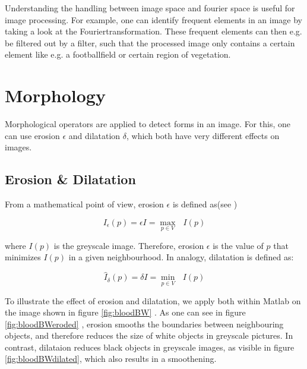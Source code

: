 Understanding the handling between image space and fourier space is useful for image processing. For example, one can identify frequent elements in an image by taking a look at the Fouriertransformation. These frequent elements can then e.g. be filtered out by a filter, such that the processed image only contains a certain element like e.g. a footballfield or certain region of vegetation.



\section{Morphology}
Morphological operators are applied to detect forms in an image. For this, one can use erosion $\epsilon$ and dilatation $\delta$, which both have very different effects on images. 

\subsection{Erosion \& Dilatation}
\label{ssec:erodil}
From a mathematical point of view, erosion $\epsilon$ is defined as(see \protect\footnotemark)  
 

\begin{equation*}
I_{\epsilon}(p)=\epsilon I = \underset{p \in V}\max \text{ } I(p)
\end{equation*}

where $I(p)$ is the greyscale image. Therefore, erosion $\epsilon$ is the value of $p$ that minimizes $I(p)$ in a given neighbourhood. In analogy, dilatation is defined as:

\begin{equation*}
\hat{I}_{\delta}(p)=\delta I = \underset{p \in V}\min \text{ } I(p)
\end{equation*}


To illustrate the effect of erosion and dilatation, we apply both within Matlab on the image shown in figure \ref{fig:bloodBW} . As one can see in figure \ref{fig:bloodBWeroded} , erosion smooths the boundaries between neighbouring objects, and therefore reduces the size of white objects in greyscale pictures. In contrast, dilataion reduces black objects in greyscale images, as visible in figure \ref{fig:bloodBWdilated}, which also results in a smoothening.

